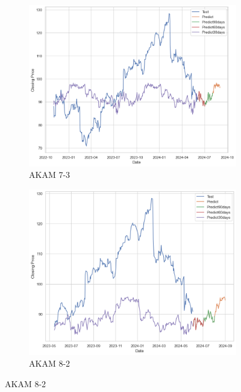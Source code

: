 \documentclass{ieeeojies}
\begin{document}
\begin{figure}[H]
    \centering
    \begin{subfigure}[b]{0.33\linewidth}
        \centering
        \includegraphics[width=\linewidth]{ETS Plot/AKAM_ETS_7_3.png}
        \caption{AKAM 7-3}
        \label{fig:akam-7-3}
    \end{subfigure}%
    \hfill
    \begin{subfigure}[b]{0.33\linewidth}
        \centering
        \includegraphics[width=\linewidth]{ETS Plot/AKAM_ETS_8_2.png}
        \caption{AKAM 8-2}
        \label{fig:akam-8-2}
    \end{subfigure}%

\end{figure}
\end{document}
